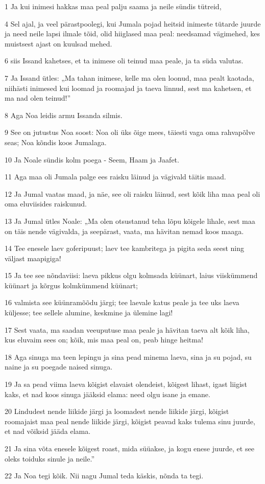 \par 1 Ja kui inimesi hakkas maa peal palju saama ja neile sündis tütreid,
\par 4 Sel ajal, ja veel pärastpoolegi, kui Jumala pojad heitsid inimeste tütarde juurde ja need neile lapsi ilmale tõid, olid hiiglased maa peal: needsamad vägimehed, kes muistsest ajast on kuulsad mehed.
\par 6 siis Issand kahetses, et ta inimese oli teinud maa peale, ja ta süda valutas.
\par 7 Ja Issand ütles: „Ma tahan inimese, kelle ma olen loonud, maa pealt kaotada, niihästi inimesed kui loomad ja roomajad ja taeva linnud, sest ma kahetsen, et ma nad olen teinud!”
\par 8 Aga Noa leidis armu Issanda silmis.
\par 9 See on jutustus Noa soost: Noa oli üks õige mees, täiesti vaga oma rahvapõlve seas; Noa kõndis koos Jumalaga.
\par 10 Ja Noale sündis kolm poega - Seem, Haam ja Jaafet.
\par 11 Aga maa oli Jumala palge ees raisku läinud ja vägivald täitis maad.
\par 12 Ja Jumal vaatas maad, ja näe, see oli raisku läinud, sest kõik liha maa peal oli oma eluviisides raiskunud.
\par 13 Ja Jumal ütles Noale: „Ma olen otsustanud teha lõpu kõigele lihale, sest maa on täis nende vägivalda, ja seepärast, vaata, ma hävitan nemad koos maaga.
\par 14 Tee enesele laev goferipuust; laev tee kambritega ja pigita seda seest ning väljast maapigiga!
\par 15 Ja tee see nõndaviisi: laeva pikkus olgu kolmsada küünart, laius viiskümmend küünart ja kõrgus kolmkümmend küünart;
\par 16 valmista see küünramõõdu järgi; tee laevale katus peale ja tee uks laeva küljesse; tee sellele alumine, keskmine ja ülemine lagi!
\par 17 Sest vaata, ma saadan veeuputuse maa peale ja hävitan taeva alt kõik liha, kus eluvaim sees on; kõik, mis maa peal on, peab hinge heitma!
\par 18 Aga sinuga ma teen lepingu ja sina pead minema laeva, sina ja su pojad, su naine ja su poegade naised sinuga.
\par 19 Ja sa pead viima laeva kõigist elavaist olendeist, kõigest lihast, igast liigist kaks, et nad koos sinuga jääksid elama: need olgu isane ja emane.
\par 20 Lindudest nende liikide järgi ja loomadest nende liikide järgi, kõigist roomajaist maa peal nende liikide järgi, kõigist peavad kaks tulema sinu juurde, et nad võiksid jääda elama.
\par 21 Ja sina võta enesele kõigest roast, mida süüakse, ja kogu enese juurde, et see oleks toiduks sinule ja neile.”
\par 22 Ja Noa tegi kõik. Nii nagu Jumal teda käskis, nõnda ta tegi.

